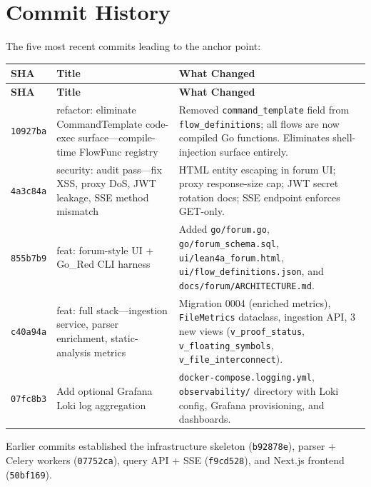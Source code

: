 
\section{Commit History}
\label{sec:commit-history}

The five most recent commits leading to the anchor point:

\begin{longtable}{@{}lp{4.8cm}p{5.5cm}@{}}
\toprule
\textbf{SHA} & \textbf{Title} & \textbf{What Changed} \\
\midrule
\endfirsthead
\toprule
\textbf{SHA} & \textbf{Title} & \textbf{What Changed} \\
\midrule
\endhead
\bottomrule
\endfoot
\texttt{10927ba}
  & \raggedright refactor: eliminate CommandTemplate code-exec surface---compile-time FlowFunc registry
  & Removed \texttt{command\_template} field from \texttt{flow\_definitions}; all flows are now compiled Go functions.  Eliminates shell-injection surface entirely. \\
\addlinespace
\texttt{4a3c84a}
  & \raggedright security: audit pass---fix XSS, proxy DoS, JWT leakage, SSE method mismatch
  & HTML entity escaping in forum UI; proxy response-size cap; JWT secret rotation docs; SSE endpoint enforces GET-only. \\
\addlinespace
\texttt{855b7b9}
  & \raggedright feat: forum-style UI + Go\_Red CLI harness
  & Added \texttt{go/forum.go}, \texttt{go/forum\_schema.sql}, \texttt{ui/lean4a\_forum.html}, \texttt{ui/flow\_definitions.json}, and \texttt{docs/forum/ARCHITECTURE.md}. \\
\addlinespace
\texttt{c40a94a}
  & \raggedright feat: full stack---ingestion service, parser enrichment, static-analysis metrics
  & Migration 0004 (enriched metrics), \texttt{FileMetrics} dataclass, ingestion API, 3 new views (\texttt{v\_proof\_status}, \texttt{v\_floating\_symbols}, \texttt{v\_file\_interconnect}). \\
\addlinespace
\texttt{07fc8b3}
  & \raggedright Add optional Grafana Loki log aggregation
  & \texttt{docker-compose.logging.yml}, \texttt{observability/} directory with Loki config, Grafana provisioning, and dashboards. \\
\end{longtable}

\noindent Earlier commits established the infrastructure skeleton
(\texttt{b92878e}), parser + Celery workers (\texttt{07752ca}), query API +
SSE (\texttt{f9cd528}), and Next.js frontend (\texttt{50bf169}).
